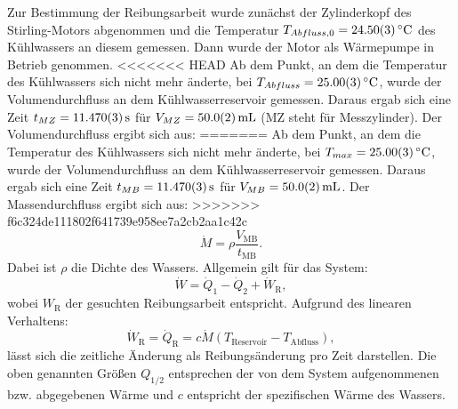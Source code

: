 	Zur Bestimmung der Reibungsarbeit wurde zunächst der Zylinderkopf des Stirling-Motors abgenommen und die Temperatur $T_{Abfluss,0} = \SI{24,5+-0,03}{\celsius}$ des Kühlwassers an diesem gemessen.
	Dann  wurde der Motor als Wärmepumpe in Betrieb genommen.
<<<<<<< HEAD
	Ab dem Punkt, an dem die Temperatur des Kühlwassers sich nicht mehr änderte, bei $T_{Abfluss} = \SI{25,0+-0,03}{\celsius}$, wurde der Volumendurchfluss an dem Kühlwasserreservoir gemessen.
	Daraus ergab sich eine Zeit $t_{MZ} = \SI{11,47+-0,003}{\second}$ für $V_{MZ} = \SI{50+-0,2}{\milli\liter}$ (MZ steht für Messzylinder).	
	Der Volumendurchfluss ergibt sich aus:
=======
	Ab dem Punkt, an dem die Temperatur des Kühlwassers sich nicht mehr änderte, bei $T_{max} = \SI{25,0+-0,03}{\celsius}$, wurde der Volumendurchfluss an dem Kühlwasserreservoir gemessen.
	Daraus ergab sich eine Zeit $t_{MB} = \SI{11,47+-0,003}{\second}$ für $V_{MB} = \SI{50+-0,2}{\milli\liter}$.
	Der Massendurchfluss ergibt sich aus:
>>>>>>> f6c324de111802f641739e958ee7a2cb2aa1c42c
	\begin{equation} %
		\dot{M} = \rho \frac{V_\text{MB}}{t_\text{MB}}.
	\end{equation} %
	Dabei ist $\rho$ die Dichte des Wassers.
	Allgemein gilt für das System:
	\begin{equation} \label{eq:W}%
		\dot{W} = \dot{Q}_1 - \dot{Q}_2 + \dot{W}_\text{R},
	\end{equation} %
	wobei $W_\text{R}$ der gesuchten Reibungsarbeit entspricht.
	Aufgrund des linearen Verhaltens:
	\begin{equation} %
		\dot{W}_\text{R} = \dot{Q}_\text{R} = c \dot{M} (T_\text{Reservoir} - T_\text{Abfluss}),
	\end{equation} %
	lässt sich die zeitliche Änderung als Reibungsänderung pro Zeit darstellen.
	Die oben genannten Größen $Q_{1/2}$ entsprechen der von dem System aufgenommenen bzw. abgegebenen Wärme und $c$ entspricht der spezifischen Wärme des Wassers.
